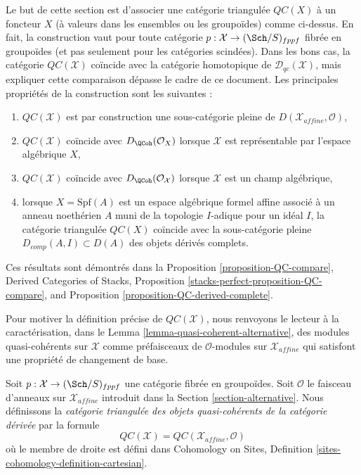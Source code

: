 \medskip\noindent
Le but de cette section est d'associer une catégorie triangulée
$\mathit{QC}(X)$ à un foncteur $X$ (à valeurs dans les ensembles ou les groupoïdes)
comme ci-dessus. En fait, la construction vaut pour toute catégorie
$p : \mathcal{X} \to (\Sch/S)_{fppf}$ fibrée en groupoïdes
(et pas seulement pour les catégories scindées). Dans les bons cas, la catégorie $\mathit{QC}(\mathcal{X})$
coïncide avec la catégorie homotopique de
$\mathcal{D}_{qc}(\mathcal{X})$,
mais expliquer cette comparaison dépasse le cadre de ce document.
Les principales propriétés de la construction sont les suivantes :
\begin{enumerate}
\item[(a)] $\mathit{QC}(\mathcal{X})$ est par construction une sous-catégorie pleine de
$D(\mathcal{X}_{affine}, \mathcal{O})$,
\item[(b)] $\mathit{QC}(\mathcal{X})$ coïncide avec $D_\QCoh(\mathcal{O}_X)$
lorsque $\mathcal{X}$ est représentable par l'espace algébrique $X$,
\item[(c)] $\mathit{QC}(\mathcal{X})$ coïncide avec
$D_\QCoh(\mathcal{O}_\mathcal{X})$ lorsque $\mathcal{X}$ est un champ algébrique,
\item[(d)] lorsque $X = \text{Spf}(A)$ est un espace algébrique formel affine
associé à un anneau noethérien $A$ muni de la topologie $I$-adique
pour un idéal $I$, la catégorie triangulée
$\mathit{QC}(X)$ coïncide avec la sous-catégorie pleine
$D_{comp}(A, I) \subset D(A)$ des objets dérivés complets.
\end{enumerate}
Ces résultats sont démontrés dans la
Proposition \ref{proposition-QC-compare},
Derived Categories of Stacks, Proposition
\ref{stacks-perfect-proposition-QC-compare}, and
Proposition \ref{proposition-QC-derived-complete}.

\medskip\noindent
Pour motiver la définition précise de $\mathit{QC}(\mathcal{X})$,
nous renvoyons le lecteur à la caractérisation, dans le
Lemma \ref{lemma-quasi-coherent-alternative},
des modules quasi-cohérents sur $\mathcal{X}$ comme préfaisceaux de
$\mathcal{O}$-modules sur $\mathcal{X}_{affine}$ qui
satisfont une propriété de changement de base.

\begin{definition}
\label{definition-QC}
Soit $p : \mathcal{X} \to (\Sch/S)_{fppf}$ une catégorie fibrée en groupoïdes.
Soit $\mathcal{O}$ le faisceau d'anneaux sur $\mathcal{X}_{affine}$ introduit
dans la Section \ref{section-alternative}. Nous définissons la
{\it catégorie triangulée des objets quasi-cohérents de la catégorie dérivée}
par la formule
$$
\mathit{QC}(\mathcal{X}) = \mathit{QC}(\mathcal{X}_{affine}, \mathcal{O})
$$
où le membre de droite est défini dans
Cohomology on Sites, Definition \ref{sites-cohomology-definition-cartesian}.
\end{definition}


